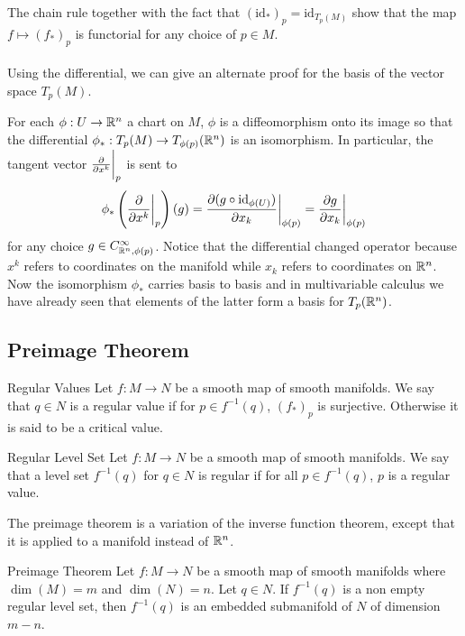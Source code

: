 \documentclass[a4paper]{article}
\begin{document}
The chain rule together with the fact that $(\text{id}_\ast)_p=\text{id}_{T_p(M)}$ show that the map $f\mapsto(f_\ast)_p$ is functorial for any choice of $p\in M$. \\~\\

Using the differential, we can give an alternate proof for the basis of the vector space $T_p(M)$. 

For each $\phi:U\to\mathbb{R}^n$ a chart on $M$, $\phi$ is a diffeomorphism onto its image so that the differential $\phi_\ast:T_p(M)\to T_{\phi(p)}(\mathbb{R}^n)$ is an isomorphism. In particular, the tangent vector $\frac{\partial}{\partial x^k}\bigg{|}_p$ is sent to $$\phi_\ast\left(\frac{\partial}{\partial x^k}\bigg{|}_p\right)(g)=\frac{\partial(g\circ\text{id}_{\phi(U)})}{\partial x_k}\bigg{|}_{\phi(p)}=\frac{\partial g}{\partial x_k}\bigg{|}_{\phi(p)}$$ for any choice $g\in C_{\mathbb{R}^n,\phi(p)}^\infty$. Notice that the differential changed operator because $x^k$ refers to coordinates on the manifold while $x_k$ refers to coordinates on $\mathbb{R}^n$. Now the isomorphism $\phi_\ast$ carries basis to basis and in multivariable calculus we have already seen that elements of the latter form a basis for $T_p(\mathbb{R}^n)$. 

\subsection{Preimage Theorem}
\begin{defn}{Regular Values}{} Let $f:M\to N$ be a smooth map of smooth manifolds. We say that $q\in N$ is a regular value if for $p\in f^{-1}(q)$, $(f_\ast)_p$ is surjective. Otherwise it is said to be a critical value. 
\end{defn}

\begin{defn}{Regular Level Set}{} Let $f:M\to N$ be a smooth map of smooth manifolds. We say that a level set $f^{-1}(q)$ for $q\in N$ is regular if for all $p\in f^{-1}(q)$, $p$ is a regular value. 
\end{defn}

The preimage theorem is a variation of the inverse function theorem, except that it is applied to a manifold instead of $\mathbb{R}^n$. 

\begin{thm}{Preimage Theorem}{} Let $f:M\to N$ be a smooth map of smooth manifolds where $\dim(M)=m$ and $\dim(N)=n$. Let $q\in N$. If $f^{-1}(q)$ is a non empty regular level set, then $f^{-1}(q)$ is an embedded submanifold of $N$ of dimension $m-n$. 
\end{thm}
\end{document}
